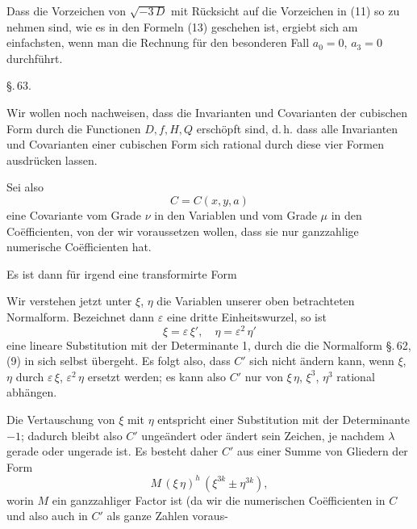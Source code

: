 Dass die Vorzeichen von $\sqrt{-3\,D}$ mit Rücksicht auf die Vorzeichen in (11) so zu nehmen sind, wie es in den Formeln (13) geschehen ist, ergiebt sich am einfachsten, wenn man die Rechnung für den besonderen Fall $a_0 = 0$, $a_3 = 0$ durchführt.

\begin{center}
\S.\,63.
\end{center}

\begin{center}
\end{center}

Wir wollen noch nachweisen, dass die Invarianten und Covarianten der cubischen Form durch die Functionen $D, f, H, Q$ erschöpft sind, d.\,h. dass alle Invarianten und Covarianten einer cubischen Form sich rational durch diese vier Formen ausdrücken lassen.

Sei also
\[
C = C(x,y,a)
\]
eine Covariante vom Grade $\nu$ in den Variablen und vom Grade $\mu$ in den Co\"efficienten, von der wir voraussetzen wollen, dass sie nur ganzzahlige numerische Co\"efficienten hat.

Es ist dann für irgend eine transformirte Form

Wir verstehen jetzt unter $\xi$, $\eta$ die Variablen unserer oben betrachteten Normalform. Bezeichnet dann $\varepsilon$ eine dritte Einheitswurzel, so ist
\[
\xi = \varepsilon\,\xi',\quad \eta = \varepsilon^2\,\eta'
\]
eine lineare Substitution mit der Determinante 1, durch die die Normalform \S.\,62, (9) in sich selbst übergeht. Es folgt also, dass $C'$ sich nicht ändern kann, wenn $\xi$, $\eta$ durch $\varepsilon\,\xi$, $\varepsilon^2\,\eta$ ersetzt werden; es kann also $C'$ nur von $\xi\,\eta$, $\xi^3$, $\eta^3$ rational abhängen.

Die Vertauschung von $\xi$ mit $\eta$ entspricht einer Substitution mit der Determinante $-1$; dadurch bleibt also $C'$ ungeändert oder ändert sein Zeichen, je nachdem $\lambda$ gerade oder ungerade ist. Es besteht daher $C'$ aus einer Summe von Gliedern der Form
\[
M\,(\xi\,\eta)^h\,(\xi^{3k} \pm \eta^{3k}),
\]
worin $M$ ein ganzzahliger Factor ist (da wir die numerischen Co\"efficienten in $C$ und also auch in $C'$ als ganze Zahlen voraus-
